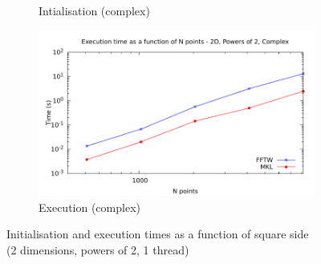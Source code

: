 \documentclass[12pt, a4paper]{article}
\begin{document}
\begin{figure}[H]
\begin{subfigure}{.5\textwidth}
\caption{Intialisation (complex)}
\label{2DPOW2CI}
\end{subfigure}%
\begin{subfigure}{.5\textwidth}
\centering
\includegraphics[width=.9\linewidth]{graphs/2d-pow2-exec-c.pdf}
\caption{Execution (complex)}
\label{2DPOW2C}
\end{subfigure}
\caption{Initialisation and execution times as a function of square side\\(2 dimensions, powers of 2, 1 thread)}
\label{2DPOW2}
\end{figure}
\end{document}
